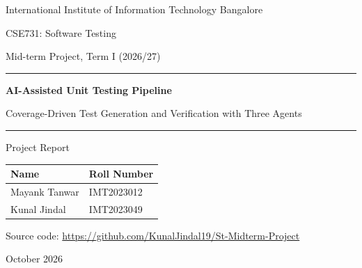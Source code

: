 \documentclass[11pt, a4paper]{article}
\begin{document}
\begin{titlepage}
    \centering
    \vspace*{1.5cm}
    {\large International Institute of Information Technology Bangalore\par}
    \vspace{0.6cm}
    {\large CSE731: Software Testing\par}
    {\normalsize Mid-term Project, Term I (2026/27)\par}
    \vspace{2.5cm}
    \rule{\textwidth}{0.6pt}\par
    \vspace{0.4cm}
    {\LARGE\bfseries AI-Assisted Unit Testing Pipeline\par}
    \vspace{0.3cm}
    {\large Coverage-Driven Test Generation and Verification with Three Agents\par}
    \vspace{0.4cm}
    \rule{\textwidth}{0.6pt}\par
    \vspace{2.5cm}
    {\large Project Report\par}
    \vspace{1.5cm}
    \begin{tabular}{ll}
        \toprule
        \textbf{Name} & \textbf{Roll Number} \\
        \midrule
        Mayank Tanwar & IMT2023012 \\
        Kunal Jindal & IMT2023049 \\
        \bottomrule
    \end{tabular}
    \vspace{1.5cm}

    {\normalsize Source code: \url{https://github.com/KunalJindal19/St-Midterm-Project}\par}
    \vfill
    {\large October 2026\par}
\end{titlepage}

\begin{abstract}
This report presents an agentic pipeline for AI-assisted unit testing. For each problem of the MBPP dataset, a Large Language Model (LLM) generates a Python function; a second LLM agent generates unit test cases, consisting of inputs and expected outputs, intended to satisfy a structural coverage criterion selected by the user; and a deterministic executor validates every test case against the dataset's reference solution, executes the valid test cases against the generated function and reports a verdict. The executor additionally constructs the control flow graph of the generated function and verifies whether the executed test cases satisfy the selected criterion. Node, edge, edge-pair and prime path coverage are supported. In the final run, both processed problems received the verdict PASS and met prime path coverage.
\end{abstract}
\end{document}
